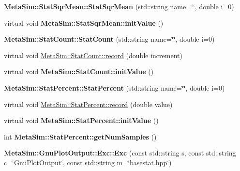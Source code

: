 \begin{DoxyCompactItemize}
\item 
{\bfseries Meta\+Sim\+::\+Stat\+Sqr\+Mean\+::\+Stat\+Sqr\+Mean} (std\+::string name=\char`\"{}\char`\"{}, double i=0)\hypertarget{group__metasim__stat_gaa4d7a741c922fa5f6352930ba9875016}{}\label{group__metasim__stat_gaa4d7a741c922fa5f6352930ba9875016}

\item 
virtual void {\bfseries Meta\+Sim\+::\+Stat\+Sqr\+Mean\+::init\+Value} ()\hypertarget{group__metasim__stat_gaa43dfad9145a9632bfa6e3ce6f0cc4d5}{}\label{group__metasim__stat_gaa43dfad9145a9632bfa6e3ce6f0cc4d5}

\item 
{\bfseries Meta\+Sim\+::\+Stat\+Count\+::\+Stat\+Count} (std\+::string name=\char`\"{}\char`\"{}, double i=0)\hypertarget{group__metasim__stat_ga1997cfd009810f55f03b56d69e7f2ff9}{}\label{group__metasim__stat_ga1997cfd009810f55f03b56d69e7f2ff9}

\item 
virtual void \hyperlink{group__metasim__stat_gaaafe9f379041d46cbe705d26aafc5c67}{Meta\+Sim\+::\+Stat\+Count\+::record} (double increment)
\item 
virtual void {\bfseries Meta\+Sim\+::\+Stat\+Count\+::init\+Value} ()\hypertarget{group__metasim__stat_gae8710a5d4a94cdd797524d17e613ff87}{}\label{group__metasim__stat_gae8710a5d4a94cdd797524d17e613ff87}

\item 
{\bfseries Meta\+Sim\+::\+Stat\+Percent\+::\+Stat\+Percent} (std\+::string name=\char`\"{}\char`\"{}, double i=0)\hypertarget{group__metasim__stat_ga58e41fe29f481a35d1e7c5de39de9009}{}\label{group__metasim__stat_ga58e41fe29f481a35d1e7c5de39de9009}

\item 
virtual void \hyperlink{group__metasim__stat_ga6fe4e2066cb72c9eb74c44d5e700cc86}{Meta\+Sim\+::\+Stat\+Percent\+::record} (double value)
\item 
virtual void {\bfseries Meta\+Sim\+::\+Stat\+Percent\+::init\+Value} ()\hypertarget{group__metasim__stat_gaeff333bf932f75410bfafeca21e5390f}{}\label{group__metasim__stat_gaeff333bf932f75410bfafeca21e5390f}

\item 
int {\bfseries Meta\+Sim\+::\+Stat\+Percent\+::get\+Num\+Samples} ()\hypertarget{group__metasim__stat_ga329cb8a42138f0d111799a238b91aad8}{}\label{group__metasim__stat_ga329cb8a42138f0d111799a238b91aad8}

\item 
{\bfseries Meta\+Sim\+::\+Gnu\+Plot\+Output\+::\+Exc\+::\+Exc} (const std\+::string s, const std\+::string c=\char`\"{}Gnu\+Plot\+Output\char`\"{}, const std\+::string m=\char`\"{}basestat.\+hpp\char`\"{})\hypertarget{group__metasim__stat_ga74b4126022f20b4b1ba2814f93abdf04}{}\label{group__metasim__stat_ga74b4126022f20b4b1ba2814f93abdf04}


\end{DoxyCompactItemize}

